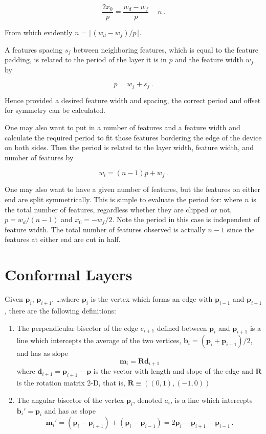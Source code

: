 \documentclass{article}
\begin{document}
$$\frac{2x_0}{p} = \frac{w_d - w_f}{p} - n \,. $$

From which evidently $n = \lfloor (w_d - w_f)/p \rfloor$.

A features spacing $s_f$ between neighboring features, which is equal to the feature padding, is related to the period of the layer it is in $p$ and the feature width $w_f$ by

$$p = w_f + s_f \,.$$

Hence provided a desired feature width and spacing, the correct period and offset for symmetry can be calculated.

One may also want to put in a number of features and a feature width and calculate the required period to fit those features bordering the edge of the device on both sides. Then the period is related to the layer width, feature width, and number of features by

$$ w_l = (n-1)p + w_f\,. $$

One may also want to have a given number of features, but the features on either end are split symmetrically. This is simple to evaluate the period for: where $n$ is the total number of features, regardless whether they are clipped or not, $p = w_d/(n-1)$ and $x_0 = -w_f/2$. Note the period in this case is independent of feature width. The total number of features observed is actually $n-1$ since the features at either end are cut in half.

\section{Conformal Layers}

Given $\mathbf{p}_i$, $\mathbf{p}_{i+1}$, \ldots where $\mathbf{p}_i$ is the vertex which forms an edge with $\mathbf{p}_{i-1}$ and $\mathbf{p}_{i+1}$, there are the following definitions:

\begin{enumerate}
    \item The perpendicular bisector of the edge $e_{i+1}$ defined between $\mathbf{p}_i$ and $\mathbf{p}_{i+1}$ is a line which intercepts the average of the two vertices, $\mathbf{b}_i = (\mathbf{p}_i + \mathbf{p}_{i+1})/2$, and has as slope $$\mathbf{m}_i = \mathbf{R}\mathbf{d}_{i+1}$$ where $\mathbf{d}_{i+1} = \mathbf{p}_{i+1} - \mathbf{p}$ is the vector with length and slope of the edge and $\mathbf{R}$ is the rotation matrix 2-D, that is, $\mathbf{R} \equiv ((0,1),(-1,0))$
    \item The angular bisector of the vertex $\mathbf{p}_i$, denoted $a_i$, is a line which intercepts $\mathbf{b}_i' = \mathbf{p}_i$ and has as slope 
        $$ \mathbf{m}_i' = (\mathbf{p}_i - \mathbf{p}_{i+1}) + (\mathbf{p}_i - \mathbf{p}_{i-1})  = 2\mathbf{p}_i - \mathbf{p}_{i+1} - \mathbf{p}_{i-1} \,. $$
\end{enumerate}
\end{document}

